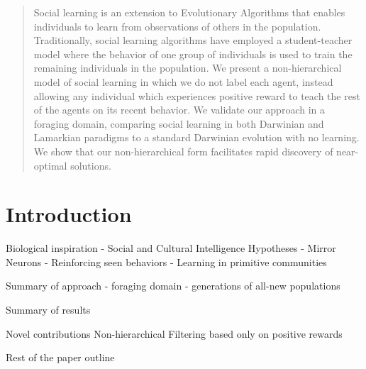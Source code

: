 \documentclass{acm_proc_article-sp}
\begin{document}
\maketitle
\begin{abstract}
Social learning is an extension to Evolutionary Algorithms that enables individuals to learn from observations of others in the population.
 Traditionally, social learning algorithms have employed a student-teacher model where the behavior of one group of individuals is used to train the remaining individuals in the population.  
 We present a non-hierarchical model of social learning in which we do not label each agent, instead allowing any individual which experiences positive reward to teach the rest of the agents on its recent behavior. 
 We validate our approach in a foraging domain, comparing social learning in both Darwinian and Lamarkian paradigms to a standard Darwinian evolution with no learning. 
 We show that our non-hierarchical form facilitates rapid discovery of near-optimal solutions.
\end{abstract}



\section{Introduction}
Biological inspiration
    - Social and Cultural Intelligence Hypotheses
    - Mirror Neurons
        - Reinforcing seen behaviors
    - Learning in primitive communities
    
Summary of approach
    - foraging domain
    - generations of all-new populations
    
Summary of results

Novel contributions
    Non-hierarchical
    Filtering based only on positive rewards
    
Rest of the paper outline
\end{document}
